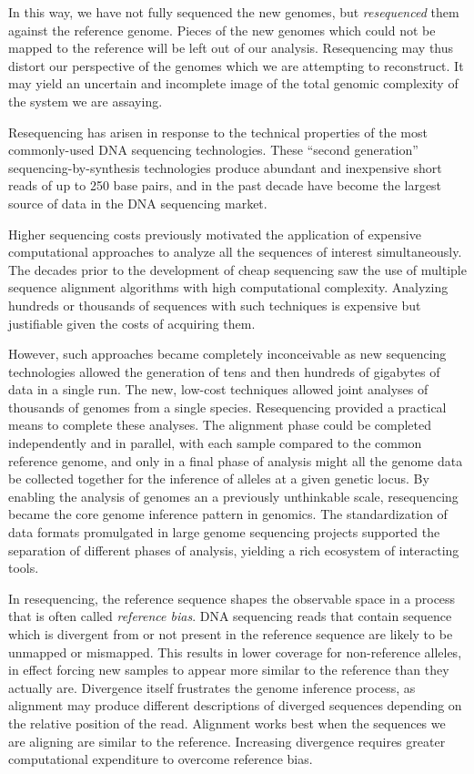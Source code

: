 In this way, we have not fully sequenced the new genomes, but \emph{resequenced} them against the reference genome.
Pieces of the new genomes which could not be mapped to the reference will be left out of our analysis.
Resequencing may thus distort our perspective of the genomes which we are attempting to reconstruct.
It may yield an uncertain and incomplete image of the total genomic complexity of the system we are assaying.

Resequencing has arisen in response to the technical properties of the most commonly-used DNA sequencing technologies.
These ``second generation'' sequencing-by-synthesis technologies produce abundant and inexpensive short reads of up to 250 base pairs, and in the past decade have become the largest source of data in the DNA sequencing market.

Higher sequencing costs previously motivated the application of expensive computational approaches to analyze all the sequences of interest simultaneously.
The decades prior to the development of cheap sequencing saw the use of multiple sequence alignment algorithms with high computational complexity.
Analyzing hundreds or thousands of sequences with such techniques is expensive but justifiable given the costs of acquiring them.

However, such approaches became completely inconceivable as new sequencing technologies allowed the generation of tens and then hundreds of gigabytes of data in a single run.
The new, low-cost techniques allowed joint analyses of thousands of genomes from a single species.
Resequencing provided a practical means to complete these analyses.
The alignment phase could be completed independently and in parallel, with each sample compared to the common reference genome, and only in a final phase of analysis might all the genome data be collected together for the inference of alleles at a given genetic locus.
By enabling the analysis of genomes an a previously unthinkable scale, resequencing became the core genome inference pattern in genomics.
The standardization of data formats promulgated in large genome sequencing projects supported the separation of different phases of analysis, yielding a rich ecosystem of interacting tools.

In resequencing, the reference sequence shapes the observable space in a process that is often called \emph{reference bias}.
DNA sequencing reads that contain sequence which is divergent from or not present in the reference sequence are likely to be unmapped or mismapped.
This results in lower coverage for non-reference alleles, in effect forcing new samples to appear more similar to the reference than they actually are.
Divergence itself frustrates the genome inference process, as alignment may produce different descriptions of diverged sequences depending on the relative position of the read.
Alignment works best when the sequences we are aligning are similar to the reference.
Increasing divergence requires greater computational expenditure to overcome reference bias.

